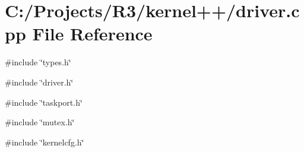 \section{C:/Projects/R3/kernel++/driver.cpp File Reference}
\label{driver_8cpp}
{\ttfamily \#include \char`\"{}types.h\char`\"{}}\par
{\ttfamily \#include \char`\"{}driver.h\char`\"{}}\par
{\ttfamily \#include \char`\"{}taskport.h\char`\"{}}\par
{\ttfamily \#include \char`\"{}mutex.h\char`\"{}}\par
{\ttfamily \#include \char`\"{}kernelcfg.h\char`\"{}}\par
